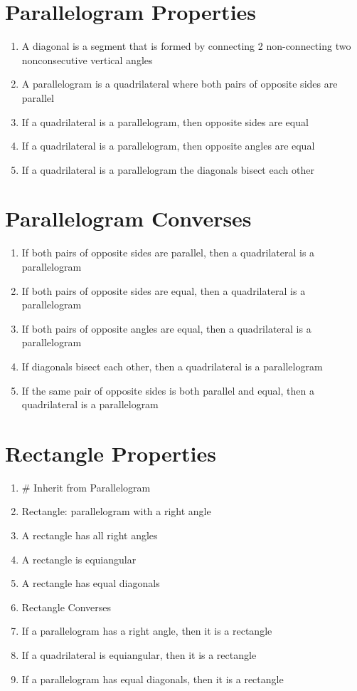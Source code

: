 \documentclass[11pt,letterpaper]{report}
\begin{document}
\section*{Parallelogram Properties}
\begin{enumerate}
    \item A diagonal is a segment that is formed by connecting 2 non-connecting two nonconsecutive vertical angles
    \item A parallelogram is a quadrilateral where both pairs of opposite sides are parallel
    \item If a quadrilateral is a parallelogram, then opposite sides are equal
    \item If a quadrilateral is a parallelogram, then opposite angles are equal
    \item If a quadrilateral is a parallelogram the diagonals bisect each other
\end{enumerate}

\section*{Parallelogram Converses}
\begin{enumerate}
    \item If both pairs of opposite sides are parallel, then a quadrilateral is a parallelogram
    \item If both pairs of opposite sides are equal, then a quadrilateral is a parallelogram
    \item If both pairs of opposite angles are equal, then a quadrilateral is a parallelogram
    \item If diagonals bisect each other, then a quadrilateral is a parallelogram
    \item If the same pair of opposite sides is both parallel and equal, then a quadrilateral is a parallelogram
\end{enumerate}

\section*{Rectangle Properties}
\begin{enumerate}
    \item \# Inherit from Parallelogram
    \item Rectangle: parallelogram with a right angle
    \item A rectangle has all right angles
    \item A rectangle is equiangular
    \item A rectangle has equal diagonals
    \item Rectangle Converses
    \item If a parallelogram has a right angle, then it is a rectangle
    \item If a quadrilateral is equiangular, then it is a rectangle
    \item If a parallelogram has equal diagonals, then it is a rectangle
\end{enumerate}
\end{document}
